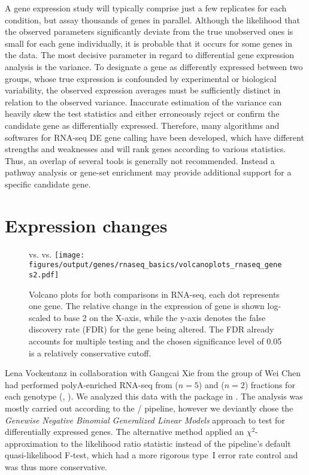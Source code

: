 A gene expression study will typically comprise just a few replicates for each condition, but assay thousands of genes in parallel. Although the likelihood that the observed parameters significantly deviate from the true unobserved ones is small for each gene individually, it is probable that it occurs for some genes in the data. The most decisive parameter in regard to differential gene expression analysis is the variance. To designate a gene as differently expressed between two groups, whose true expression is confounded by experimental or biological variability, the observed expression averages must be sufficiently distinct in relation to the observed variance. Inaccurate estimation of the variance can heavily skew the test statistics and either erroneously reject or confirm the candidate gene as differentially expressed. Therefore, many algorithms and softwares for RNA-seq DE gene calling have been developed, which have different strengths and weaknesses and will rank genes according to various statistics. Thus, an overlap of several tools is generally not recommended. Instead a pathway analysis or gene-set enrichment may provide additional support for a specific candidate gene. 

\section{Expression changes}
\label{chap:r:degenes:changes}
\begin{figure}[!ht]
	{\Large \dnmtchip vs. \dnmtwt \hspace{2cm} \kithi vs. \kitlow \hspace{4cm}} 
	\centering
	\texttt{[image: figures/output/genes/rnaseq\_basics/volcanoplots\_rnaseq\_genes2.pdf]} 
	\caption{Volcano plots for both comparisons in RNA-seq, each dot represents one gene. The relative change in the expression of gene is shown log-scaled to base \num{2} on the X-axis, while the y-axis denotes the false discovery rate (FDR)\cite{Benjamini1995} for the gene being altered. The FDR already accounts for multiple testing and the chosen significance level of \num{0.05} is a relatively conservative cutoff\cite{Anders2010,McCarthy2012}.}
	\label{fig:genes:volcanoplots_rnaseq_genes}
\end{figure}
Lena Vockentanz in collaboration with Gangcai Xie from the group of Wei Chen had performed polyA-enriched RNA-seq from \mllafnine \kithi ($n\!= \!5$) and \kitlow ($n\!= \!2$) fractions for each genotype (\dnmtchip, \dnmtwt). We analyzed this data with the  package\cite{Robinson2010} in . The analysis was mostly carried out according to the / pipeline\cite{Chen2016c}, however we deviantly chose the \emph{Genewise Negative Binomial Generalized Linear Models} approach\cite{McCarthy2012} to test for differentially expressed genes. The alternative method applied an $\chi^2$-approximation to the likelihood ratio statistic instead of the pipeline's default quasi-likelihood F-test, which had a more rigorous type~I error rate control and was thus more conservative. 

